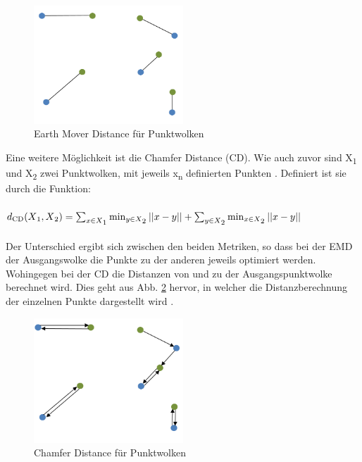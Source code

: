 \documentclass{llncs}
\begin{document}
\begin{figure}[htbp] 
	\centering
	\includegraphics[width=0.5\textwidth]{emd_distance.png}
	\caption{Earth Mover Distance für Punktwolken \protect\cite{3dpointcloud}}
	\label{fig:Bild14}
\end{figure}		
Eine weitere Möglichkeit ist die Chamfer Distance (CD). Wie auch zuvor sind  X\textsubscript{1} und X\textsubscript{2} zwei Punktwolken, mit jeweils x\textsubscript{n} definierten Punkten \cite{autoencoderloss}. Definiert ist sie durch die Funktion:
\\\\
\begin{math}
d\textsubscript{CD}(X\textsubscript{1},X\textsubscript{2})=\sum_{x\in X\textsubscript{1}} \min_{y \in X\textsubscript{2}}||x-y|| + \sum_{y\in X\textsubscript{2}} \min_{x \in X\textsubscript{2}}||x-y||
\end{math}
\\\\
Der Unterschied ergibt sich zwischen den beiden Metriken, so dass bei der EMD der Ausgangswolke die Punkte zu der anderen jeweils optimiert werden. Wohingegen bei der CD die Distanzen von und zu der Ausgangspunktwolke berechnet wird. Dies geht aus Abb. \ref{fig:Bild15} hervor, in welcher die Distanzberechnung der einzelnen Punkte dargestellt wird \cite{autoencoderloss}.
\begin{figure}[htbp] 
	\centering
	\includegraphics[width=0.5\textwidth]{champfer.png}
	\caption{Chamfer Distance für Punktwolken \protect\cite{3dpointcloud}}
	\label{fig:Bild15}
\end{figure} 
\newpage
\end{document}
